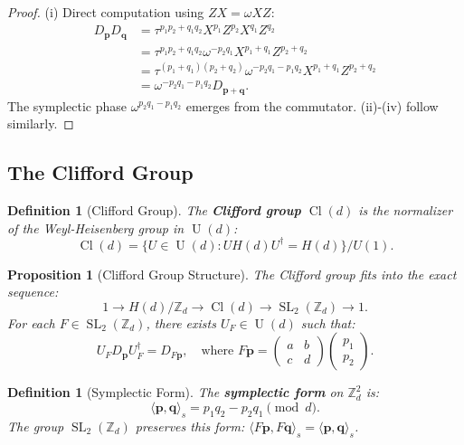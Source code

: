 \documentclass[a4paper,11pt]{article}
\newtheorem{definition}[theorem]{Definition}
\newtheorem{proposition}[theorem]{Proposition}
\DeclareMathOperator{\SL}{SL}
\DeclareMathOperator{\U}{U}
\DeclareMathOperator{\Cl}{Cl}
\newcommand{\Z}{\mathbb{Z}}
\begin{document}
\begin{proof}
(i) Direct computation using $ZX = \omega XZ$:
\begin{align}
D_\mathbf{p} D_\mathbf{q} &= \tau^{p_1 p_2 + q_1 q_2} X^{p_1} Z^{p_2} X^{q_1} Z^{q_2} \\
&= \tau^{p_1 p_2 + q_1 q_2} \omega^{-p_2 q_1} X^{p_1 + q_1} Z^{p_2 + q_2} \\
&= \tau^{(p_1+q_1)(p_2+q_2)} \omega^{-p_2 q_1 - p_1 q_2} X^{p_1+q_1} Z^{p_2+q_2} \\
&= \omega^{-p_2 q_1 - p_1 q_2} D_{\mathbf{p}+\mathbf{q}}.
\end{align}
The symplectic phase $\omega^{p_2 q_1 - p_1 q_2}$ emerges from the commutator. (ii)-(iv) follow similarly.
\end{proof}

\subsection{The Clifford Group}

\begin{definition}[Clifford Group]
The \textbf{Clifford group} $\Cl(d)$ is the normalizer of the Weyl-Heisenberg group in $\U(d)$:
\begin{equation}
\Cl(d) = \{U \in \U(d) : U H(d) U^\dagger = H(d)\} / U(1).
\end{equation}
\end{definition}

\begin{proposition}[Clifford Group Structure]\label{prop:clifford-structure}
The Clifford group fits into the exact sequence:
\begin{equation}
1 \to H(d)/\Z_d \to \Cl(d) \to \SL_2(\Z_d) \to 1.
\end{equation}
For each $F \in \SL_2(\Z_d)$, there exists $U_F \in \U(d)$ such that:
\begin{equation}
U_F D_\mathbf{p} U_F^\dagger = D_{F\mathbf{p}}, \quad \text{where } F\mathbf{p} = \begin{pmatrix} a & b \\ c & d \end{pmatrix} \begin{pmatrix} p_1 \\ p_2 \end{pmatrix}.
\end{equation}
\end{proposition}

\begin{definition}[Symplectic Form]
The \textbf{symplectic form} on $\Z_d^2$ is:
\begin{equation}
\langle \mathbf{p}, \mathbf{q} \rangle_s = p_1 q_2 - p_2 q_1 \pmod d.
\end{equation}
The group $\SL_2(\Z_d)$ preserves this form: $\langle F\mathbf{p}, F\mathbf{q} \rangle_s = \langle \mathbf{p}, \mathbf{q} \rangle_s$.
\end{definition}
\end{document}
